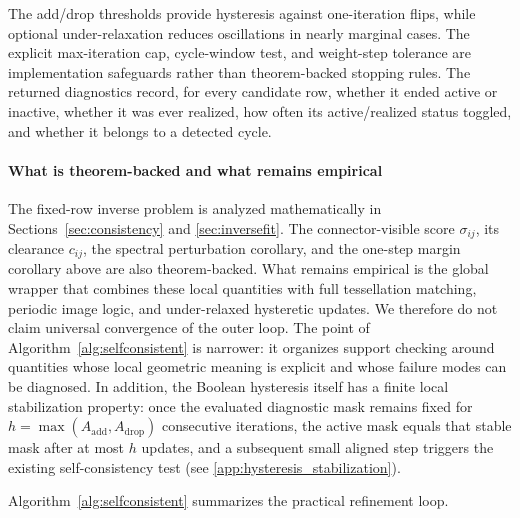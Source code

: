 \documentclass[preprint,12pt]{elsarticle}
\begin{document}
The add/drop thresholds provide hysteresis against one-iteration flips, while
optional under-relaxation reduces oscillations in nearly marginal cases. The
explicit max-iteration cap, cycle-window test, and weight-step tolerance are
implementation safeguards rather than theorem-backed stopping rules. The
returned diagnostics record, for every candidate row, whether it ended active or
inactive, whether it was ever realized, how often its active/realized status
toggled, and whether it belongs to a detected cycle.

\paragraph{What is theorem-backed and what remains empirical}
The fixed-row inverse problem is analyzed mathematically in
Sections~\ref{sec:consistency} and \ref{sec:inversefit}. The connector-visible
score $\sigma_{ij}$, its clearance $c_{ij}$, the spectral perturbation
corollary, and the one-step margin corollary above are also theorem-backed.
What remains empirical is the global wrapper that combines these local
quantities with full tessellation matching, periodic image logic, and
under-relaxed hysteretic updates. We therefore do not claim universal
convergence of the outer loop. The point of Algorithm~\ref{alg:selfconsistent}
is narrower: it organizes support checking around quantities whose local
geometric meaning is explicit and whose failure modes can be diagnosed. In
addition, the Boolean hysteresis itself has a finite local stabilization
property: once the evaluated diagnostic mask remains fixed for
$h=\max(A_{\mathrm{add}},A_{\mathrm{drop}})$ consecutive iterations, the active
mask equals that stable mask after at most $h$ updates, and a subsequent small
aligned step triggers the existing self-consistency test
(see \ref{app:hysteresis_stabilization}).

Algorithm~\ref{alg:selfconsistent} summarizes the practical refinement loop.
\end{document}
